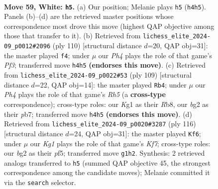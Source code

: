 \documentclass[11pt]{article}
\begin{document}
\clearpage

\begin{figure}[p]\centering
\begin{subfigure}{0.46\textwidth}\centering
\resizebox{\linewidth}{!}{%
\newchessgame
\chessboard[
  setfen={8/4kp2/6p1/1R6/1P5P/R7/1r4b1/6K1 w - - 3 59},
  showmover=false,
  pgfstyle=straightmove, color=movearrow, markmove={h4-h5}
]}
\caption{}
\end{subfigure}\hfill
\begin{subfigure}{0.46\textwidth}\centering
\resizebox{\linewidth}{!}{%
\newchessgame
\chessboard[
  setfen={8/8/4kp2/1R4p1/1P6/4KP2/1r6/8 w - - 8 56},
  showmover=false,
  pgfstyle=straightmove, color=movearrow, markmove={f3-f4}
]}
\caption{}
\end{subfigure}
\\[4pt]
\begin{subfigure}{0.46\textwidth}\centering
\resizebox{\linewidth}{!}{%
\newchessgame
\chessboard[
  setfen={1r6/1PR5/B1p5/P1k2p2/7r/5K2/8/8 b - - 1 55},
  showmover=false,
  pgfstyle=straightmove, color=movearrow, markmove={h4-b4}
]}
\caption{}
\end{subfigure}\hfill
\begin{subfigure}{0.46\textwidth}\centering
\resizebox{\linewidth}{!}{%
\newchessgame
\chessboard[
  setfen={R7/P4K1k/8/r4p1p/7P/6P1/8/8 w - - 2 59},
  showmover=false,
  pgfstyle=straightmove, color=movearrow, markmove={f7-f6}
]}
\caption{}
\end{subfigure}
\caption{\textbf{Move 59, White: \texttt{h5}.} (a) Our position; Melanie plays \texttt{h5} (\texttt{h4h5}). Panels (b)--(d) are the retrieved master positions whose correspondence most drove this move (highest QAP objective among those that transfer to it). (b) Retrieved from \texttt{lichess\_elite\_2024-09\_p0012\#2096} (ply 110) [structural distance $d$=20, QAP obj=31]: the master played \texttt{f4}; under $\mu$ our \emph{Ph4} plays the role of that game's \emph{Pf3}; transferred move \texttt{h4h5} \textbf{(endorses this move)}. (c) Retrieved from \texttt{lichess\_elite\_2024-09\_p0022\#53} (ply 109) [structural distance $d$=22, QAP obj=14]: the master played \texttt{Rb4}; under $\mu$ our \emph{Ph4} plays the role of that game's \emph{Rh5} (a \textbf{cross-type} correspondence); cross-type roles: our \emph{K}g1 as their \emph{R}b8, our \emph{b}g2 as their \emph{p}b7; transferred move \texttt{h4h5} \textbf{(endorses this move)}. (d) Retrieved from \texttt{lichess\_elite\_2024-09\_p0020\#3287} (ply 116) [structural distance $d$=24, QAP obj=31]: the master played \texttt{Kf6}; under $\mu$ our \emph{Kg1} plays the role of that game's \emph{Kf7}; cross-type roles: our \emph{b}g2 as their \emph{p}f5; transferred move \texttt{g1h2}. Synthesis: 2 retrieved analogs transferred to \texttt{h5} (summed QAP objective 45, the strongest correspondence among the candidate moves); Melanie committed it via the \texttt{search} selector.}
\label{fig:thought-m116}
\end{figure}
\end{document}
